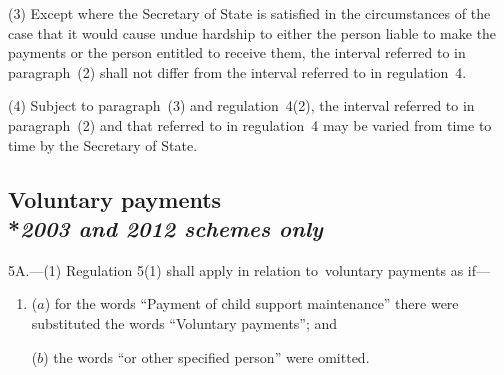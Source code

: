 \documentclass[12pt,a4paper]{article}
\begin{document}
%
%

(3) Except where the Secretary of State is satisfied in the circumstances of the case that it would cause undue hardship to either the person liable to make the payments or the person entitled to receive them, the interval referred to in paragraph~(2) shall not differ from the interval referred to in regulation~4.

(4) Subject to paragraph~(3) and regulation~4(2), the interval referred to in paragraph~(2) and that referred to in regulation~4 may be varied from time to time by the Secretary of State.


\subsection[5A. Voluntary payments]{Voluntary payments\\*\emph{2003 and 2012 schemes only}}

5A.---(1)  Regulation 5(1) shall apply in relation to~voluntary payments as if—
\begin{enumerate}\item[]
($a$) for the words “Payment of child support maintenance” there were substituted the words “Voluntary payments”; and

($b$) the words “or other specified person” were omitted.
\end{enumerate}
\end{document}
